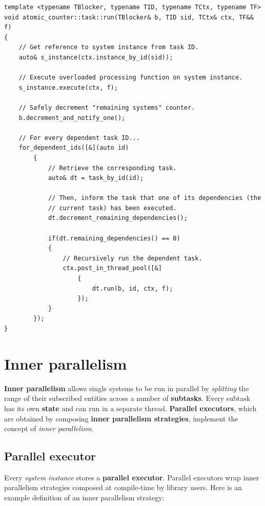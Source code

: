 \documentclass[oneside, 12pt, a4paper, openany]{book}
\begin{document}
\begin{verbatim}
template <typename TBlocker, typename TID, typename TCtx, typename TF>
void atomic_counter::task::run(TBlocker& b, TID sid, TCtx& ctx, TF&& f)
{
    // Get reference to system instance from task ID.
    auto& s_instance(ctx.instance_by_id(sid));

    // Execute overloaded processing function on system instance.
    s_instance.execute(ctx, f);

    // Safely decrement "remaining systems" counter.
    b.decrement_and_notify_one();

    // For every dependent task ID...
    for_dependent_ids([&](auto id)
        {
            // Retrieve the corresponding task.
            auto& dt = task_by_id(id);

            // Then, inform the task that one of its dependencies (the
            // current task) has been executed.
            dt.decrement_remaining_dependencies();

            if(dt.remaining_dependencies() == 0)
            {
                // Recursively run the dependent task.
                ctx.post_in_thread_pool([&]
                    {
                        dt.run(b, id, ctx, f);
                    });
            }
        });
}
\end{verbatim}

\hypertarget{multithreading_inner_par}{\section{Inner
parallelism}\label{multithreading_inner_par}}

\textbf{Inner parallelism} allows single systems to be run in parallel
by \emph{splitting} the range of their subscribed entities across a
number of \textbf{subtasks}. Every subtask has its own \textbf{state}
and can run in a separate thread. \textbf{Parallel executors}, which are
obtained by composing \textbf{inner parallelism strategies}, implement
the concept of \emph{inner parallelism}.

\hypertarget{multithreading_par_executor}{\subsection{Parallel
executor}\label{multithreading_par_executor}}

Every \emph{system instance} stores a \textbf{parallel executor}.
Parallel executors wrap inner parallelism strategies composed at
compile-time by library users. Here is an example definition of an inner
parallelism strategy:
\end{document}
